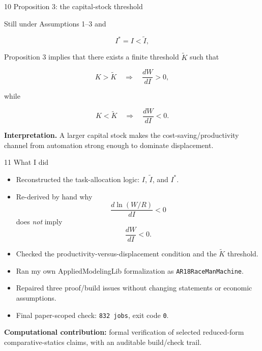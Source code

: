\documentclass[aspectratio=169,11pt]{beamer}
\begin{document}

\begin{frame}{10 \textperiodcentered{} Proposition 3: the capital-stock threshold}

  Still under Assumptions 1--3 and

  \[
    I^*=I<\widetilde I,
  \]

  Proposition 3 implies that there exists a finite threshold
  $\widetilde K$ such that

  \[
    K>\widetilde K
    \quad\Longrightarrow\quad
    \frac{dW}{dI}>0,
  \]

  while

  \[
    K<\widetilde K
    \quad\Longrightarrow\quad
    \frac{dW}{dI}<0.
  \]

  \medskip

  \textbf{Interpretation.}
  A larger capital stock makes the cost-saving/productivity channel
  from automation strong enough to dominate displacement.

\end{frame}


\begin{frame}{11 \textperiodcentered{} What I did}

  \begin{itemize}\small

    \item Reconstructed the task-allocation logic:
    $I$, $\widetilde I$, and $I^*$.

    \item Re-derived by hand why
    \[
      \frac{d\ln(W/R)}{dI}<0
    \]
    does \emph{not} imply
    \[
      \frac{dW}{dI}<0.
    \]

    \item Checked the productivity-versus-displacement condition
    and the $\widetilde K$ threshold.

    \item Ran my own AppliedModelingLib formalization as
    \texttt{AR18RaceManMachine}.

    \item Repaired three proof/build issues without changing
    statements or economic assumptions.

    \item Final paper-scoped check:
    \texttt{832 jobs}, exit code \texttt{0}.

  \end{itemize}

  \medskip

  \textbf{Computational contribution:}
  formal verification of selected reduced-form comparative-statics
  claims, with an auditable build/check trail.

\end{frame}
\end{document}
